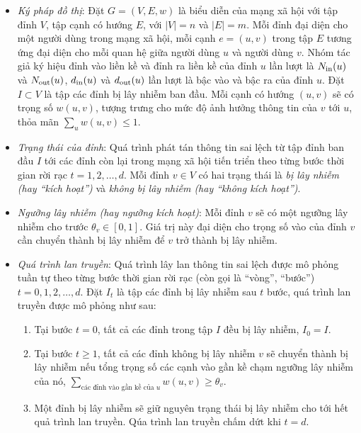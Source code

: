 \begin {itemize}
\item {\itshape Ký pháp đồ thị}: Đặt $G=(V,E,w)$ là biểu diễn của mạng xã hội với tập đỉnh $V$, tập cạnh có hướng $E$, với $|V|=n$ và $|E|=m$. Mỗi đỉnh đại diện cho một người dùng trong mạng xã hội, mỗi cạnh $e=(u,v)$ trong tập $E$ tương ứng đại diện cho mỗi quan hệ giữa người dùng $u$ và người dùng $v$. Nhóm tác giả ký hiệu đỉnh vào liền kề và đỉnh ra liền kề của đỉnh $u$ lần lượt là $N_{\textup{in}}(u)$ và $N_{\textup{out}}(u)$, $d_{\textup{in}}(u)$ và $d_{\textup{out}}(u)$ lần lượt là bậc vào và bậc ra của đỉnh $u$. Đặt $I \subset V$ là tập các đỉnh bị lây nhiễm ban đầu. Mỗi cạnh có hướng $(u,v)$ sẽ có trọng số $w(u,v)$, tượng trưng cho mức độ ảnh hưởng thông tin của $v$ tới $u$, thỏa mãn $\sum_{u} w(u,v) \leq 1$.

\item {\itshape Trạng thái của đỉnh}: Quá trình phát tán thông tin sai lệch từ tập đỉnh ban đầu $I$ tới các đỉnh còn lại trong mạng xã hội tiến triển theo từng bước thời gian rời rạc $t=1,2,…,d$. Mỗi đỉnh $v \in V$ có hai trạng thái là {\itshape bị lây nhiễm (hay “kích hoạt”)} và {\itshape không bị lây nhiễm (hay “không kích hoạt”)}.

\item {\itshape Ngưỡng lây nhiễm (hay ngưỡng kích hoạt)}: Mỗi đỉnh $v$ sẽ có một ngưỡng lây nhiễm cho trước $\theta_{v} \in [0,1]$. Giá trị này đại diện cho trọng số vào của đỉnh $v$ cần chuyển thành bị lây nhiễm để $v$ trở thành bị lây nhiễm.

\item {\itshape Quá trình lan truyền}: Quá trình lây lan thông tin sai lệch được mô phỏng tuần tự theo từng bước thời gian rời rạc (còn gọi là “vòng”, “bước”) $t=0,1,2,…,d$. Đặt $I_{t}$ là tập các đỉnh bị lây nhiễm sau $t$ bước, quá trình lan truyền được mô phỏng như sau:
\begin {enumerate} [+]
\item Tại bước $t=0$, tất cả các đỉnh trong tập $I$ đều bị lây nhiễm, $I_{0}=I$.

\item Tại bước $t\geq1$, tất cả các đỉnh không bị lây nhiễm $v$ sẽ chuyển thành bị lây nhiễm nếu tổng trọng số các cạnh vào gần kề chạm ngưỡng lây nhiễm của nó, $\sum_{\text{các đỉnh vào gần kề của $u$}} w(u,v) \geq \theta_{v}$.	

\item Một đỉnh bị lây nhiễm sẽ giữ nguyên trạng thái bị lây nhiễm cho tới hết quả trình lan truyền. Qúa trình lan truyền chấm dứt khi $t = d$.
\end {enumerate}
\end {itemize}

